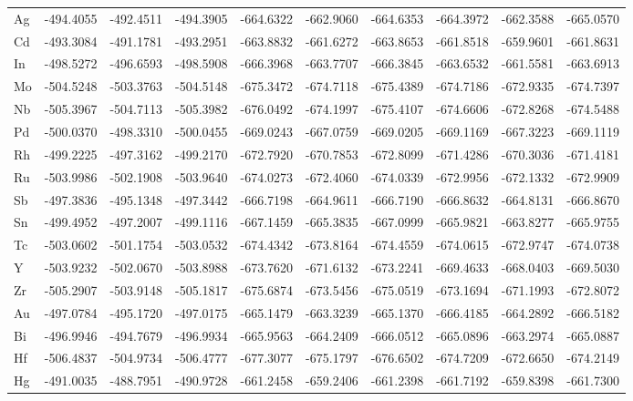 \begin{table}[h]
{\begin{tabular}{*{10}{l}}
      Ag & -494.4055 & -492.4511 & -494.3905 & -664.6322 & -662.9060 & -664.6353 & -664.3972 & -662.3588 & -665.0570 \\
      Cd & -493.3084 & -491.1781 & -493.2951 & -663.8832 & -661.6272 & -663.8653 & -661.8518 & -659.9601 & -661.8631 \\
      In & -498.5272 & -496.6593 & -498.5908 & -666.3968 & -663.7707 & -666.3845 & -663.6532 & -661.5581 & -663.6913 \\
      Mo & -504.5248 & -503.3763 & -504.5148 & -675.3472 & -674.7118 & -675.4389 & -674.7186 & -672.9335 & -674.7397 \\
      Nb & -505.3967 & -504.7113 & -505.3982 & -676.0492 & -674.1997 & -675.4107 & -674.6606 & -672.8268 & -674.5488 \\
      Pd & -500.0370 & -498.3310 & -500.0455 & -669.0243 & -667.0759 & -669.0205 & -669.1169 & -667.3223 & -669.1119 \\
      Rh & -499.2225 & -497.3162 & -499.2170 & -672.7920 & -670.7853 & -672.8099 & -671.4286 & -670.3036 & -671.4181 \\
      Ru & -503.9986 & -502.1908 & -503.9640 & -674.0273 & -672.4060 & -674.0339 & -672.9956 & -672.1332 & -672.9909 \\
      Sb & -497.3836 & -495.1348 & -497.3442 & -666.7198 & -664.9611 & -666.7190 & -666.8632 & -664.8131 & -666.8670 \\
      Sn & -499.4952 & -497.2007 & -499.1116 & -667.1459 & -665.3835 & -667.0999 & -665.9821 & -663.8277 & -665.9755 \\
      Tc & -503.0602 & -501.1754 & -503.0532 & -674.4342 & -673.8164 & -674.4559 & -674.0615 & -672.9747 & -674.0738 \\
      Y  & -503.9232 & -502.0670 & -503.8988 & -673.7620 & -671.6132 & -673.2241 & -669.4633 & -668.0403 & -669.5030 \\
      Zr & -505.2907 & -503.9148 & -505.1817 & -675.6874 & -673.5456 & -675.0519 & -673.1694 & -671.1993 & -672.8072 \\
      Au & -497.0784 & -495.1720 & -497.0175 & -665.1479 & -663.3239 & -665.1370 & -666.4185 & -664.2892 & -666.5182 \\
      Bi & -496.9946 & -494.7679 & -496.9934 & -665.9563 & -664.2409 & -666.0512 & -665.0896 & -663.2974 & -665.0887 \\
      Hf & -506.4837 & -504.9734 & -506.4777 & -677.3077 & -675.1797 & -676.6502 & -674.7209 & -672.6650 & -674.2149 \\
      Hg & -491.0035 & -488.7951 & -490.9728 & -661.2458 & -659.2406 & -661.2398 & -661.7192 & -659.8398 & -661.7300 \\

\end{tabular}}
\end{table}
